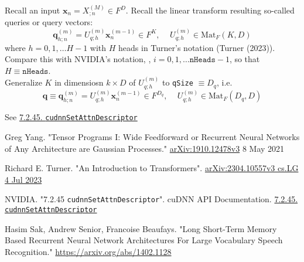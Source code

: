 \documentclass[10pt]{amsart}
\begin{document}
\begin{multicols*}{2}
Recall an input $\mathbf{x}_n = X^{(M)}_{;n} \in F^D$. Recall the linear transform resulting so-called queries or query vectors:
\[
\mathbf{q}^{(m)}_{h; n} = U^{(m)}_{q;h} \mathbf{x}^{(m-1)}_n \in F^K, \quad \, U^{(m)}_{q; h} \in \text{Mat}_F(K, D)
\]
where $h=0,1,\dots H-1$ with $H$ heads in Turner's notation (Turner (2023)\cite{Turn2023}). Compare this with NVIDIA's notation, \cite{NSAtn2023}, $i=0,1,\dots \texttt{nHeads} - 1$, so that $H \equiv \texttt{nHeads}$.\\

Generalize $K$ in dimensiosn $k\times D$ of $U^{(m)}_{q;h}$ to \texttt{qSize} $\equiv D_q$, i.e.
\[
\mathbf{q} \equiv \mathbf{q}^{(m)}_{h ; n} = U^{(m)}_{q;h} \mathbf{x}_n^{(m-1)} \in F^{D_q}, \quad \,  U^{(m)}_{q;h} \in \text{Mat}_F(D_q, D)
\] 

See \href{https://docs.nvidia.com/deeplearning/cudnn/api/index.html#cudnnSetAttnDescriptor}{7.2.45. \texttt{cudnnSetAttnDescriptor}}

\end{multicols*}

\begin{thebibliography}{9}

Greg Yang. "Tensor Programs I: Wide Feedforward or Recurrent Neural Networks of Any Architecture are Gaussian Processes." \href{https://arxiv.org/pdf/1910.12478.pdf}{arXiv:1910.12478v3} 8 May 2021

Richard E. Turner. "An Introduction to Transformers". \href{https://arxiv.org/pdf/2304.10557.pdf}{arXiv:2304.10557v3 cs.LG 4 Jul 2023}

NVIDIA. "7.2.45 \texttt{cudnnSetAttnDescriptor}". cuDNN API Documentation. \href{https://docs.nvidia.com/deeplearning/cudnn/api/index.html#cudnnSetAttnDescriptor}{7.2.45. \texttt{cudnnSetAttnDescriptor}}

Hasim Sak, Andrew Senior, Francoise Beaufays. "Long Short-Term Memory Based Recurrent Neural Network Architectures For Large Vocabulary Speech Recognition." \url{https://arxiv.org/abs/1402.1128}

\end{thebibliography}
\end{document}
